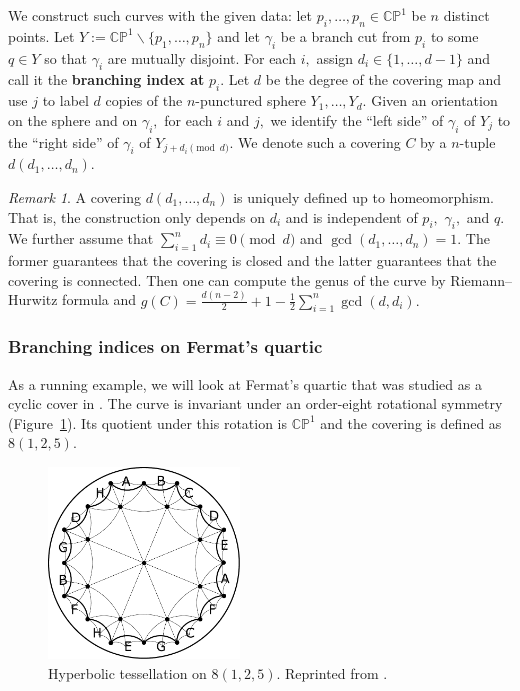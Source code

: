 \documentclass[12pt,reqno]{amsart}
\theoremstyle{definition}
\theoremstyle{remark}
\newtheorem*{remark}{Remark}
\begin{document}
We construct such curves with the given data: let $p_i, \ldots , p_n \in \mathbb{C}\mathbb{P}^1$ be $n$ distinct points. Let $Y := \mathbb{C}\mathbb{P}^1 \backslash \{p_1, \ldots, p_n\}$ and let $\gamma_i$ be a branch cut from $p_i$ to some $q \in Y$ so that $\gamma_i$ are mutually disjoint. For each $i,$ assign $d_i \in \{1, \ldots, d - 1\}$ and call it the \textbf{branching index at} $p_i.$ Let $d$ be the degree of the covering map and use $j$ to label $d$ copies of the $n$-punctured sphere $Y_1, \ldots , Y_d.$ Given an orientation on the sphere and on $\gamma_i,$ for each $i$ and $j,$ we identify the ``left side'' of $\gamma_i$ of $Y_j$ to the ``right side'' of $\gamma_i$ of $Y_{j + d_i \pmod d}.$ We denote such a covering $C$ by a $n$-tuple $d (d_1, \ldots , d_n).$

\begin{remark} A covering $d (d_1, \ldots , d_n)$ is uniquely defined up to homeomorphism. That is, the construction only depends on $d_i$ and is independent of $p_i,$ $\gamma_i,$ and $q.$ We further assume that $\sum\limits_{i=1}^n d_i \equiv 0 \pmod d$ and $\gcd (d_1, \ldots, d_n) = 1.$ The former guarantees that the covering is closed and the latter guarantees that the covering is connected. Then one can compute the genus of the curve by Riemann--Hurwitz formula and $g(C) = \frac{d (n-2)}{2} + 1 - \frac{1}{2} \sum\limits_{i=1}^n \gcd(d,d_i).$ 
\end{remark}

\subsubsection*{Branching indices on Fermat's quartic}
As a running example, we will look at Fermat's quartic that was studied as a cyclic cover in \cite{dami}. The curve is invariant under an order-eight rotational symmetry (Figure~\ref{fig:125}). Its quotient under this rotation is $\mathbb{C}\mathbb{P}^1$ and the covering is defined as $8 (1, 2, 5).$

\begin{figure}[htbp] 
   \centering
   \includegraphics[width=2in]{figures/125_base.pdf} 
  \caption{Hyperbolic tessellation on $8(1, 2, 5).$ Reprinted from \cite{dami}.}
  \label{fig:125}
\end{figure}
\end{document}
